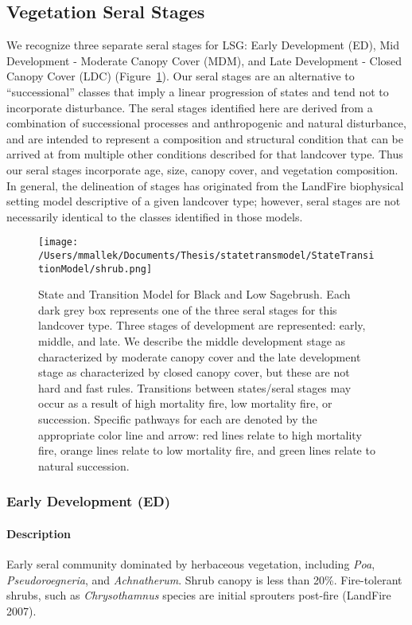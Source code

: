 \subsection*{Vegetation Seral Stages}
We recognize three separate seral stages for LSG: Early Development (ED), Mid Development - Moderate Canopy Cover (MDM), and Late Development - Closed Canopy Cover (LDC) (Figure~\ref{lsg_transmodel}). Our seral stages are an alternative to ``successional'' classes that imply a linear progression of states and tend not to incorporate disturbance. The seral stages identified here are derived from a combination of successional processes and anthropogenic and natural disturbance, and are intended to represent a composition and structural condition that can be arrived at from multiple other conditions described for that landcover type. Thus our seral stages incorporate age, size, canopy cover, and vegetation composition. In general, the delineation of stages has originated from the LandFire biophysical setting model descriptive of a given landcover type; however, seral stages are not necessarily identical to the classes identified in those models.


\begin{figure}[htbp]
\centering
\texttt{[image: /Users/mmallek/Documents/Thesis/statetransmodel/StateTransitionModel/shrub.png]}
\caption{State and Transition Model for Black and Low Sagebrush. Each dark grey box represents one of the three seral stages for this landcover type. Three stages of development are represented: early, middle, and late. We describe the middle development stage as characterized by moderate canopy cover and the late development stage as characterized by closed canopy cover, but these are not hard and fast rules. Transitions between states/seral stages may occur as a result of high mortality fire, low mortality fire, or succession. Specific pathways for each are denoted by the appropriate color line and arrow: red lines relate to high mortality fire, orange lines relate to low mortality fire, and green lines relate to natural succession.} 
\label{lsg_transmodel}
\end{figure}

\subsubsection{Early Development (ED)} 

\paragraph{Description} Early seral community dominated by herbaceous vegetation, including \emph{Poa}, \emph{Pseudoroegneria}, and \emph{Achnatherum}. Shrub canopy is less than 20\%. Fire-tolerant shrubs, such as \emph{Chrysothamnus} species are initial sprouters post-fire (LandFire 2007).

